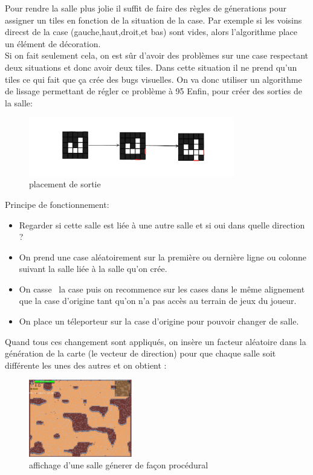 \documentclass[a4paper,11pt]{article}
\begin{document}
\bigskip

Pour rendre la salle plus jolie il suffit de faire des règles de génerations pour assigner un tiles en fonction de la situation de la case. Par exemple si les voisins direcst de la case (gauche,haut,droit,et bas) sont vides, alors l'algorithme place un élément de décoration.\\
Si on fait seulement cela, on est sûr d'avoir des problèmes sur une case respectant deux situations et donc avoir deux tiles. Dans cette situation il ne prend qu'un tiles ce qui fait que ça crée des bugs visuelles. On va donc utiliser un algorithme de lissage permettant de régler ce problème à 95%
\newpage
Enfin, pour créer des sorties de la salle:
\begin{figure}[h]
    \centering
    \includegraphics[width=0.8\textwidth]{./img/placementSortie.png}
    \caption{placement de sortie}
    \label{fig:exemple placement de sorties}
\end{figure}

Principe de fonctionnement:
\begin{itemize}
    \item Regarder si cette salle est liée à une autre salle et si oui dans quelle direction ?
    \item On prend une case aléatoirement sur la première ou dernière ligne ou colonne suivant la salle liée à la salle qu'on crée. 
    \item On \guillemotleft casse \guillemotright \ la case puis on recommence sur les cases dans le même alignement que la case d'origine tant qu'on n'a pas accès au terrain de jeux du joueur.
    \item On place un téleporteur sur la case d'origine pour pouvoir changer de salle.
\end{itemize}

\bigskip
Quand tous ces changement sont appliqués, on insère un facteur aléatoire dans la génération de la carte (le vecteur de direction) pour que chaque salle soit différente les unes des autres et on obtient : 

\begin{figure}[h]
\centering
\includegraphics[width=0.4\textwidth]{./img/SalleFinal.png}
\caption{affichage d'une salle génerer de façon procédural}
\label{fig:affichage de la salle final}
\end{figure}
\end{document}
